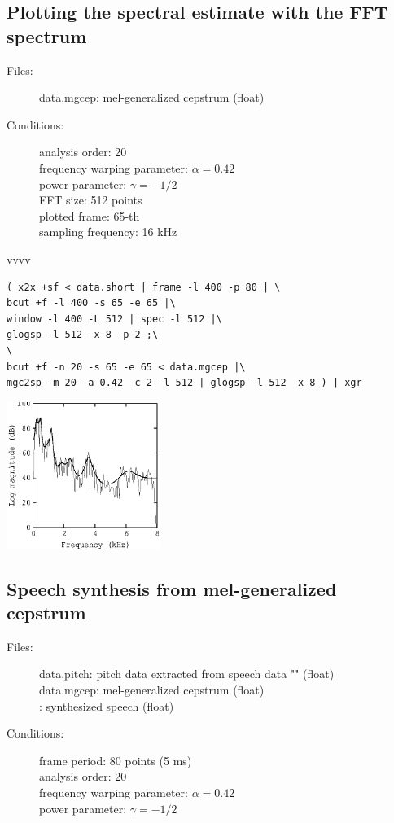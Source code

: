 \documentclass[a4paper,10pt]{article}
\begin{document}
\subsection{Plotting the spectral estimate with the FFT spectrum}

\begin{description}
\item[Files:]
  data.mgcep: mel-generalized cepstrum (float)
\item[Conditions:]
  analysis order: 20\\
  frequency warping parameter: $\alpha = 0.42$\\
  power parameter: $\gamma = -1/2$\\
  FFT size: 512 points\\
  plotted frame: 65-th\\
  sampling frequency: 16 kHz
\end{description}
vvvv
\begin{verbatim}
( x2x +sf < data.short | frame -l 400 -p 80 | \
bcut +f -l 400 -s 65 -e 65 |\
window -l 400 -L 512 | spec -l 512 |\
glogsp -l 512 -x 8 -p 2 ;\
\
bcut +f -n 20 -s 65 -e 65 < data.mgcep |\
mgc2sp -m 20 -a 0.42 -c 2 -l 512 | glogsp -l 512 -x 8 ) | xgr
\end{verbatim}

\includegraphics[width=5cm]{eps/data.mgcep.glogsp.eps}

\subsection{Speech synthesis from mel-generalized cepstrum}

\begin{description}
\item[Files:]
  data.pitch: pitch data extracted from speech data
           ""
           (float)\\
  data.mgcep: mel-generalized cepstrum (float)\\
    :
  synthesized speech (float)
\item[Conditions:]
  frame period: 80 points (5 ms)\\
  analysis order: 20\\
  frequency warping parameter: $\alpha = 0.42$\\
  power parameter: $\gamma = -1/2$
\end{description}
\end{document}
